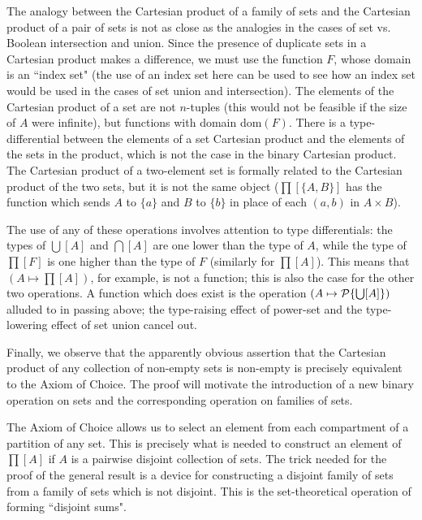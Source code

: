 The analogy between the Cartesian product of a family
of sets and the Cartesian product of a pair of sets is not as close as the
analogies in the cases of set vs. Boolean
intersection and union.
Since the presence of duplicate sets in a Cartesian product makes a
difference, we must use the function $F$, whose
domain is an ``index set"
(the use of an index set here can be used to see how an index set
would be used in the cases of set union and intersection).
The elements of the Cartesian product of a set are not
$n$-tuples (this would not be feasible if the size of $A$ were infinite), but functions with domain dom$(F)$.  There is a
type-differential between 
the elements of a set Cartesian product and the elements of the sets
in the product, which is not the case in the binary Cartesian product.
The Cartesian product of a two-element set is formally related to the
Cartesian product of the two sets, but it is not the same object
($\prod[\{A,B\}]$ has the function which sends $A$ to $\{a\}$
and $B$ to $\{b\}$ in place of each $(a,b)$ in $A \times B$).

The use of any of these operations involves attention to type differentials: the types of $\bigcup[A]$ and $\bigcap [A]$ are one
lower than the type of $A$, while the type of $\prod[F]$ is one higher than the
type of $F$ (similarly for $\prod[A]$).  This means that $(A \mapsto
\prod[A])$, for example, is not a function; this is also the
case for the other two operations.  A function which does exist is the
operation $(A \mapsto  {\cal P}\{\bigcup[A]\})$ alluded to in passing above;
the type-raising effect of power-set and the type-lowering effect of set
union cancel out.

Finally, we observe that the apparently obvious assertion that
the Cartesian product
of any collection of non-empty sets is non-empty is precisely equivalent to the
Axiom of Choice.  The proof will motivate the
introduction of a new binary operation on sets and the corresponding operation
on families of sets.

The Axiom of Choice allows us to select an element from each
compartment of a partition of any set.  This is precisely what
is needed to construct an element of $\prod[A]$ if $A$ is a pairwise
disjoint collection of sets.  The trick needed for the proof of
the general result is a device for constructing a disjoint
family of sets from a family of sets which is not disjoint.  This is the
set-theoretical operation of forming ``disjoint sums".

